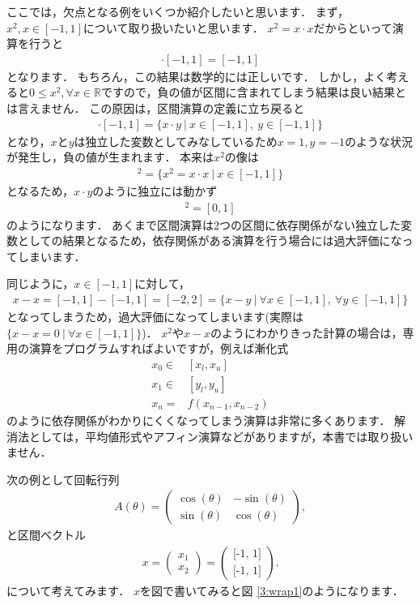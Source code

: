 ここでは，欠点となる例をいくつか紹介したいと思います．
まず，$x^2, x \in [-1, 1]$について取り扱いたいと思います．
$x^2 = x \cdot x$だからといって演算を行うと
\begin{align*}
	[-1, 1] \cdot [-1, 1] = [-1, 1]
\end{align*}
となります．
もちろん，この結果は数学的には正しいです．
しかし，よく考えると$0 \le x^2, \forall x \in {\mathbb R}$ですので，負の値が区間に含まれてしまう結果は良い結果とは言えません．
この原因は，区間演算の定義に立ち戻ると
\begin{align*}
	[-1, 1] \cdot [-1, 1] = \{ x \cdot y ~ | ~ x \in [-1, 1], ~ y \in [-1, 1]  \}
\end{align*}
となり，$x$と$y$は独立した変数としてみなしているため$x = 1, y = -1$のような状況が発生し，負の値が生まれます．
本来は$x^2$の像は
\begin{align*}
	[-1, 1]^2 = \{ x^2 = x \cdot x ~ | ~ x \in [-1, 1]  \}
\end{align*}
となるため，$x \cdot y$のように独立には動かず
\begin{align*}
	[-1, 1]^2 = [0, 1]
\end{align*}
のようになります．
あくまで区間演算は2つの区間に依存関係がない独立した変数としての結果となるため，依存関係がある演算を行う場合には過大評価になってしまいます．

同じように，$x \in [-1, 1]$に対して，
\begin{align*}
	x - x = [-1, 1] - [-1, 1] = [-2, 2] = \{ x - y ~ | ~ \forall x \in [-1, 1], ~ \forall y \in [-1, 1]  \}
\end{align*}
となってしまうため，過大評価になってしまいます(実際は$\{ x - x = 0 ~ | ~ \forall x \in [-1, 1]  \}$)．
$x^2$や$x - x$のようにわかりきった計算の場合は，専用の演算をプログラムすればよいですが，例えば漸化式
\begin{align*}
	x_0 \in& [ x_l, x_u ] \\
	x_1 \in& [ y_l, y_u ] \\
	x_{n} =& f(x_{n-1}, x_{n - 2})
\end{align*}
のように依存関係がわかりにくくなってしまう演算は非常に多くあります．
解消法としては，平均値形式やアフィン演算などがありますが，本書では取り扱いません．


次の例として回転行列
\begin{align*}
	A(\theta) = \left( \begin{array}{cc}
	\cos(\theta) & -\sin(\theta) \\
	\sin(\theta) & \cos(\theta)
	\end{array}\right),
\end{align*}
と区間ベクトル
\begin{align*}
	x = \left( \begin{array}{c}
	x_1 \\
	x_2
	\end{array}\right) = \left(
	\begin{array}{c}
	\mbox{[-1, 1]} \\
	\mbox{[-1, 1]}
	\end{array}
	\right).
\end{align*}
について考えてみます．
$x$を図で書いてみると図 \ref{3:wrap1}のようになります．

